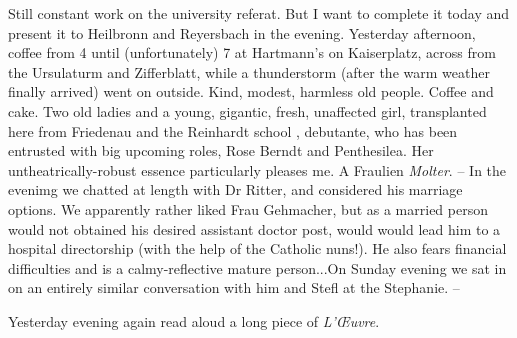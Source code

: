
Still constant work on the university referat. But I want to complete it today and present it to Heilbronn and Reyersbach in the evening. Yesterday afternoon, coffee from 4 until (unfortunately) 7 at Hartmann's on Kaiserplatz, across from the Ursulaturm and Zifferblatt, while a thunderstorm (after the warm weather finally arrived) went on outside. Kind, modest, harmless old people. Coffee and cake. Two old ladies and a young, gigantic, fresh, unaffected girl, transplanted here from Friedenau and the Reinhardt school , debutante, who has been entrusted with big upcoming roles, Rose Berndt and Penthesilea. Her untheatrically-robust essence particularly pleases me. A Fraulien \textit{Molter}. -- In the evenimg we chatted at length with Dr Ritter,  and considered his marriage options. We apparently rather liked Frau Gehmacher, but as a married person would not obtained his desired assistant doctor post, would would lead him to a hospital directorship (with the help of the Catholic nuns!). He also fears financial difficulties and is a calmy-reflective mature person...On Sunday evening we sat in on an entirely similar conversation with him and Stefl at the Stephanie. --

Yesterday evening again read aloud a long piece of \textit{L'\OE uvre}.


